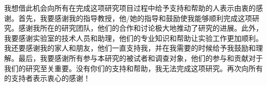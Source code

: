 \begin{thanks}

我想借此机会向所有在完成这项研究项目过程中给予支持和帮助的人表示由衷的感谢。首先，我要感谢我的指导教授，他/她的指导和鼓励使我能够顺利完成这项研究。感谢我所在的研究团队，他们的合作和讨论极大地推动了研究的进展。此外，我要感谢实验室的技术人员和助理，他们的专业知识和帮助让实验工作更加顺利。我还要感谢我的家人和朋友，他们一直支持我，并在我需要的时候给予我鼓励和理解。最后，我要感谢所有参与本研究的被试者和调查对象，他们的参与和贡献对于我们的研究至关重要。没有你们的支持和帮助，我无法完成这项研究。再次向所有的支持者表示衷心的感谢！

\end{thanks}